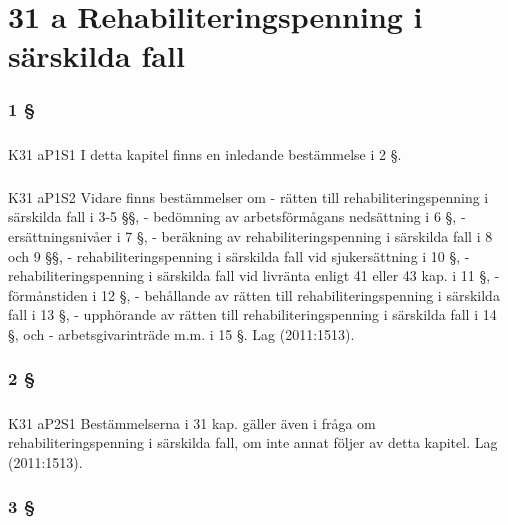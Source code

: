 \documentclass[a4paper,notitlepage,openany,10pt]{book}
\begin{document}
\chapter*{31 a Rehabiliteringspenning i särskilda fall}
\subsection*{1 §}
\paragraph*{}
{\tiny K31 aP1S1}
I detta kapitel finns en inledande bestämmelse i 2 §.
\paragraph*{}
{\tiny K31 aP1S2}
Vidare finns bestämmelser om
\newline - rätten till rehabiliteringspenning i särskilda fall i 3-5 §§,
\newline - bedömning av arbetsförmågans nedsättning i 6 §,
\newline - ersättningsnivåer i 7 §,
\newline - beräkning av rehabiliteringspenning i särskilda fall i 8 och 9 §§,
\newline - rehabiliteringspenning i särskilda fall vid sjukersättning i 10 §,
\newline - rehabiliteringspenning i särskilda fall vid livränta enligt 41 eller 43 kap. i 11 §,
\newline - förmånstiden i 12 §,
\newline - behållande av rätten till rehabiliteringspenning i särskilda fall i 13 §,
\newline - upphörande av rätten till rehabiliteringspenning i särskilda fall i 14 §, och
\newline - arbetsgivarinträde m.m. i 15 §.
Lag (2011:1513).
\subsection*{2 §}
\paragraph*{}
{\tiny K31 aP2S1}
Bestämmelserna i 31 kap. gäller även i fråga om rehabiliteringspenning i särskilda fall, om inte annat följer av detta kapitel.
Lag (2011:1513).
\subsection*{3 §}
\end{document}
